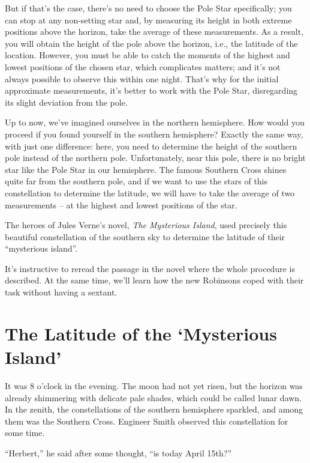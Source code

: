 But if that's the case, there's no need to choose the Pole Star specifically; you can stop at any non-setting star and, by measuring its height in both extreme positions above the horizon, take the average of these measurements. As a result, you will obtain the height of the pole above the horizon, i.e., the latitude of the location. However, you must be able to catch the moments of the highest and lowest positions of the chosen star, which complicates matters; and it's not always possible to observe this within one night. That's why for the initial approximate measurements, it's better to work with the Pole Star, disregarding its slight deviation from the pole.

Up to now, we've imagined ourselves in the northern hemisphere. How would you proceed if you found yourself in the southern hemisphere? Exactly the same way, with just one difference: here, you need to determine the height of the southern pole instead of the northern pole. Unfortunately, near this pole, there is no bright star like the Pole Star in our hemisphere. The famous Southern Cross shines quite far from the southern pole, and if we want to use the stars of this constellation to determine the latitude, we will have to take the average of two measurements -- at the highest and lowest positions of the star.

The heroes of Jules Verne's novel, \emph{The Mysterious Island}, used precisely this beautiful constellation of the southern sky to determine the latitude of their ``mysterious island''.

It's instructive to reread the passage in the novel where the whole procedure is described. At the same time, we'll learn how the new Robinsons coped with their task without having a sextant.



\section{The Latitude of the `Mysterious Island'}
\label{sec-7.2}

It was 8 o'clock in the evening. The moon had not yet risen, but the horizon was already shimmering with delicate pale shades, which could be called lunar dawn. In the zenith, the constellations of the southern hemisphere sparkled, and among them was the Southern Cross. Engineer Smith observed this constellation for some time.

``Herbert,'' he said after some thought, ``is today April 15th?''

